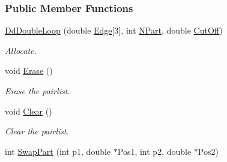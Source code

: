 \subsubsection*{\-Public \-Member \-Functions}
\begin{DoxyCompactItemize}
\item 
\hyperlink{classDdDoubleLoop_ac6bab403b0b1578fcb14b996b377d10f}{\-Dd\-Double\-Loop} (double \hyperlink{classDomDecBasics_a8895c89605e91c6cf7430bad336f77c6}{\-Edge}\mbox{[}3\mbox{]}, int \hyperlink{classDomDecBasics_abdcc792391d8c5092471dff191de47f4}{\-N\-Part}, double \hyperlink{classDomDecBasics_af2411aba2dd63fa22b1bc279653ff7a0}{\-Cut\-Off})
\begin{DoxyCompactList}\small\item\em \-Allocate. \end{DoxyCompactList}\item 
void \hyperlink{classDdDoubleLoop_a98ae2e78109ea826eea71da14c37ce95}{\-Erase} ()
\begin{DoxyCompactList}\small\item\em \-Erase the pairlist. \end{DoxyCompactList}\item 
\hypertarget{classDdDoubleLoop_aa71d36872f416feaa853788a7a7a7ef8}{void \hyperlink{classDdDoubleLoop_aa71d36872f416feaa853788a7a7a7ef8}{\-Clear} ()}\label{classDdDoubleLoop_aa71d36872f416feaa853788a7a7a7ef8}

\begin{DoxyCompactList}\small\item\em \-Clear the pairlist. \end{DoxyCompactList}\item 
\hypertarget{classDdDoubleLoop_a19f169980d772f5f0df4c37de864ef48}{int \hyperlink{classDdDoubleLoop_a19f169980d772f5f0df4c37de864ef48}{\-Swap\-Part} (int p1, double $\ast$\-Pos1, int p2, double $\ast$\-Pos2)}\label{classDdDoubleLoop_a19f169980d772f5f0df4c37de864ef48}


\end{DoxyCompactItemize}
